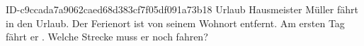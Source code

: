 \begin{exercise}
      {ID-c9ccada7a9062caed68d383cf7f05df091a73b18}
      {Urlaub}
  \ifproblem\problem
    Hausmeister Müller fährt in den Urlaub. Der Ferienort ist  von seinem
    Wohnort entfernt. Am ersten Tag fährt er . Welche Strecke muss er noch
    fahren?
  \fi
\end{exercise}
